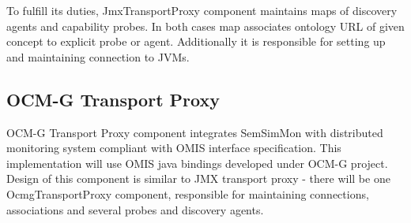 To fulfill its duties, JmxTransportProxy component maintains maps of discovery agents and capability probes. In both cases map associates ontology URL of given concept to explicit probe or agent. Additionally it is responsible for setting up and maintaining connection to JVMs.

\subsection{OCM-G Transport Proxy}

OCM-G Transport Proxy component integrates SemSimMon with distributed monitoring system compliant with OMIS interface specification. This implementation will use OMIS java bindings developed under OCM-G project. Design of this component is similar to JMX transport proxy - there will be one OcmgTransportProxy component, responsible for maintaining connections, associations and several probes and discovery agents.
